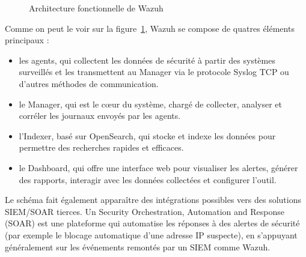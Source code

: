 \documentclass[a4paper, 11pt]{article}
\begin{document}
\begin{figure}[H]
\caption{Architecture fonctionnelle de Wazuh}
\label{fig:archi-wazuh}
\end{figure}


Comme on peut le voir sur la figure~\ref{fig:archi-wazuh}, Wazuh se compose de quatres éléments principaux :
\par\bigskip


\begin{itemize}
  \item[$\bullet$] les agents, qui collectent les données de sécurité à partir des systèmes surveillés et les transmettent au Manager via le protocole Syslog TCP ou d'autres méthodes de communication.
  \item[$\bullet$] le Manager, qui est le cœur du système, chargé de collecter, analyser et corréler les journaux envoyés par les agents.
  \item[$\bullet$] l'Indexer, basé sur OpenSearch, qui stocke et indexe les données pour permettre des recherches rapides et efficaces.
  \item[$\bullet$] le Dashboard, qui offre une interface web pour visualiser les alertes, générer des rapports, interagir avec les données collectées et configurer l'outil.
\end{itemize}
\par\bigskip

Le schéma fait également apparaître des intégrations possibles vers des solutions SIEM/SOAR tierces. Un Security Orchestration, Automation and Response (SOAR)
 est une plateforme qui automatise les réponses à des alertes de sécurité (par exemple le blocage automatique d'une adresse IP suspecte), en s'appuyant généralement
  sur les événements remontés par un SIEM comme Wazuh.
\par\bigskip
\end{document}
